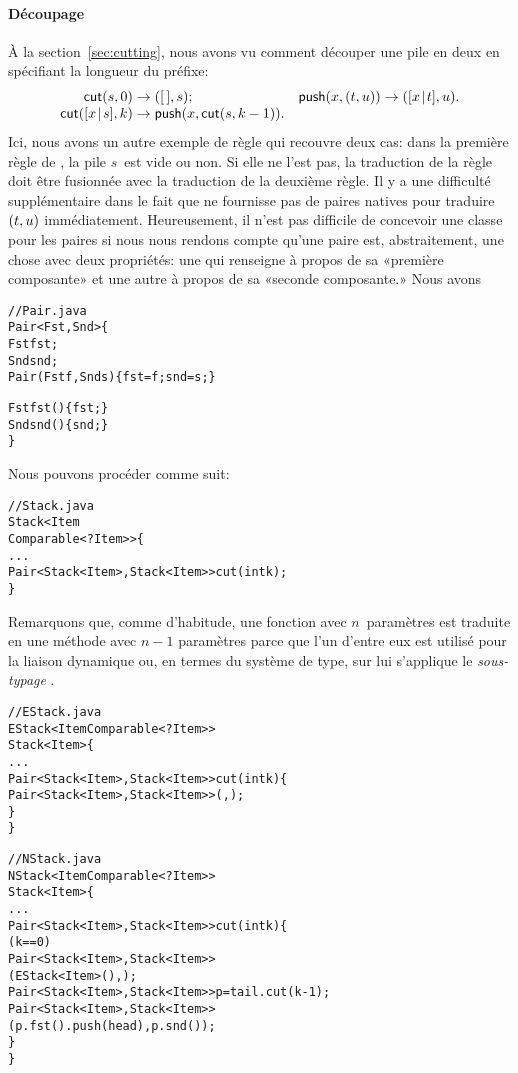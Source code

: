 \paragraph{Découpage}

À la section~\vref{sec:cutting}, nous avons vu comment découper une
pile en deux en spécifiant la longueur du préfixe:
\begin{equation*}
\begin{array}{@{}r@{\;}l@{\;}lr@{\;}l@{\;}l@{}}
\fun{cut}(s,0) & \rightarrow & \pair{\el}{s};
& \fun{push}(x,\pair{t}{u}) & \rightarrow & \pair{\cons{x}{t}}{u}.\\
\fun{cut}(\cons{x}{s},k) & \rightarrow
& \fun{push}(x,\fun{cut}(s,k-1)).
\end{array}
\end{equation*}
Ici, nous avons un autre exemple de règle qui recouvre deux cas: dans
la première règle de , la pile \(s\)~est vide ou non. Si
elle ne l'est pas, la traduction de la règle doit être fusionnée avec
la traduction de la deuxième règle. Il y a une difficulté
supplémentaire dans le fait que \Java ne fournisse pas de paires
natives pour traduire \(({t},{u})\) immédiatement. Heureusement, il
n'est pas difficile de concevoir une classe pour les paires si nous
nous rendons compte qu'une paire est, abstraitement, une chose avec
deux propriétés: une qui renseigne à propos de sa «première
composante» et une autre à propos de sa «seconde composante.» Nous
avons
\begin{alltt}
// Pair.java
\public \class Pair<Fst,Snd> \{
  \protectedX \final Fst fst;
  \protectedX \final Snd snd;
  \public Pair(\final Fst f, \final Snd s) \{fst = f; snd = s;\}

  \public Fst fst() \{ \return fst; \}
  \public Snd snd() \{ \return snd; \}
\}
\end{alltt}
Nous pouvons procéder comme suit:
\begin{alltt}
// Stack.java
\public \abstractX \class Stack<Item
\hfill\extends Comparable<? \super Item>> \{
  ...
  \public \abstractX
            Pair<Stack<Item>,Stack<Item>> cut(\final int k);
\}
\end{alltt}
Remarquons que, comme d'habitude, une fonction avec \(n\)~paramètres
est traduite en une méthode avec \(n-1\) paramètres parce que l'un
d'entre eux est utilisé pour la liaison dynamique ou, en termes du
système de type, sur lui s'applique le \emph{sous-typage}
\citep{Pierce_2002}.
\begin{alltt}
// EStack.java
\public \class EStack<Item \extends Comparable<? \super Item>>
       \extends Stack<Item> \{
  ...
  \public Pair<Stack<Item>,Stack<Item>> cut(\final int k) \{
    \return \new Pair<Stack<Item>,Stack<Item>>(\this,\this);
  \}
\}

// NStack.java
\public \class NStack<Item \extends Comparable<? \super Item>>
       \extends Stack<Item> \{
  ...
  \public Pair<Stack<Item>,Stack<Item>> cut(\final int k) \{
    \ifX (k == 0)
       \return \new Pair<Stack<Item>,Stack<Item>>
                      (\new EStack<Item>(),\this);
    Pair<Stack<Item>,Stack<Item>> p = tail.cut(k-1);
    \return \new Pair<Stack<Item>,Stack<Item>>
                   (p.fst().push(head),p.snd());
  \}
\}
\end{alltt}
